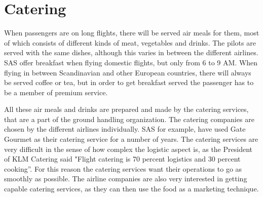 \section{Catering} 
When passengers are on long flights, there will be served air meals for them, most of which consists of different kinds of meat, vegetables and drinks. The pilots are served with the same dishes, although this varies in between the different airlines\cite{cate_pilotfood1}\cite{cate_pilotfood2}. SAS offer breakfast when flying domestic flights, but only from 6 to 9 AM\cite{cate_SASIndri}. When flying in between Scandinavian and other European countries, there will always be served coffee or tea, but in order to get breakfast served the passenger has to be a member of premium service\cite{cate_SASscanda}.

All these air meals and drinks are prepared and made by the catering services, that are a part of the ground handling organization. The catering companies are chosen by the different airlines individually. SAS for example, have used Gate Gourmet\cite{cate_SASGourmet} as their catering service for a number of years. The catering services are very difficult in the sense of how complex the logistic aspect is, as the President of KLM Catering said "Flight catering is 70 
percent logistics and 30 percent cooking”\cite{cate_BookSection}. For this reason the catering services want their operations to go as smoothly as possible. The airline companies are also very interested in getting capable catering services, as they can then use the food as a marketing technique\cite{cate_BookSection}. 